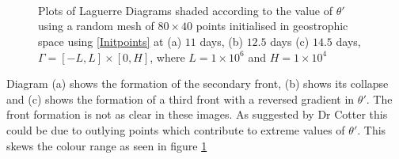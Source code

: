 \begin{figure}[h!]
	\centering
	\\
	\\
	\\
	\caption{Plots of Laguerre Diagrams shaded according to the value of $\theta '$ using a random mesh of $80 \times 40$ points initialised in geostrophic space using \ref{Initpoints} at (a) $11$ days, (b) $12.5$ days (c) $14.5$ days, $\Gamma = [-L,L]\times[0,H]$, where $L = 1\times10^6$ and $H = 1\times10^4$}
	\label{fig: front_cycle}
\end{figure}
\pagebreak
Diagram (a) shows the formation of the secondary front, (b) shows its collapse and (c) shows the formation of a third front with a reversed gradient in $\theta '$. The front formation is not as clear in these images. As suggested by Dr Cotter this could be due to outlying points which contribute to extreme values of $\theta '$. This skews the colour range as seen in figure \ref{fig: front_cycle}


